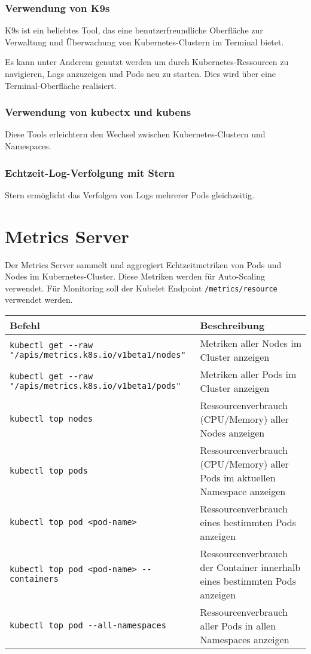 \subsubsection{Verwendung von K9s}
K9s ist ein beliebtes Tool, das eine benutzerfreundliche Oberfläche zur Verwaltung und Überwachung von Kubernetes-Clustern im Terminal bietet.

Es kann unter Anderem genutzt werden um durch Kubernetes-Ressourcen zu navigieren, Logs anzuzeigen und Pods neu zu starten. Dies wird über eine Terminal-Oberfläche realisiert.

\subsubsection{Verwendung von kubectx und kubens}
Diese Tools erleichtern den Wechsel zwischen Kubernetes-Clustern und Namespaces.


\subsubsection{Echtzeit-Log-Verfolgung mit Stern}
Stern ermöglicht das Verfolgen von Logs mehrerer Pods gleichzeitig.


\section{Metrics Server}
Der Metrics Server sammelt und aggregiert Echtzeitmetriken von Pods und Nodes im Kubernetes-Cluster. Diese Metriken werden für Auto-Scaling verwendet. Für Monitoring soll der Kubelet Endpoint \texttt{/metrics/resource} verwendet werden.\\

\noindent
\begin{tabular}{
|p{}|p{}|}
\hline
\textbf{Befehl} & \textbf{Beschreibung} \\
\hline
\texttt{kubectl get {-}{-}raw "/apis/metrics.k8s.io/v1beta1/nodes"} & Metriken aller Nodes im Cluster anzeigen \\
\texttt{kubectl get {-}{-}raw "/apis/metrics.k8s.io/v1beta1/pods"} & Metriken aller Pods im Cluster anzeigen \\
\texttt{kubectl top nodes} & Ressourcenverbrauch (CPU/Memory) aller Nodes anzeigen \\
\texttt{kubectl top pods} & Ressourcenverbrauch (CPU/Memory) aller Pods im aktuellen Namespace anzeigen \\
\texttt{kubectl top pod <pod-name>} & Ressourcenverbrauch eines bestimmten Pods anzeigen \\
\texttt{kubectl top pod <pod-name> {-}{-}containers} & Ressourcenverbrauch der Container innerhalb eines bestimmten Pods anzeigen \\
\texttt{kubectl top pod {-}{-}all-namespaces} & Ressourcenverbrauch aller Pods in allen Namespaces anzeigen \\
\hline
\end{tabular}
